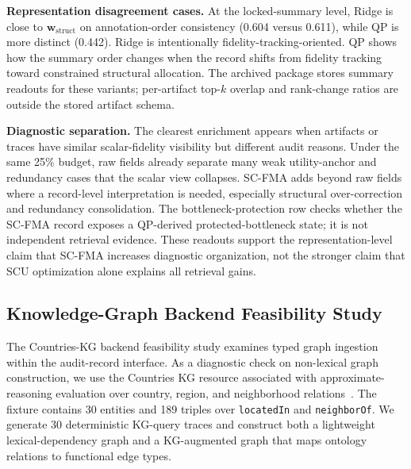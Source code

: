 \documentclass[a4paper,fleqn]{cas-sc}
\newcommand{\wstruct}{\ensuremath{\mathbf{w}_{\mathrm{struct}}}}
\begin{document}
\textbf{Representation disagreement cases.} At the locked-summary level, Ridge is close to \wstruct{} on annotation-order consistency (0.604 versus 0.611), while QP is more distinct (0.442). Ridge is intentionally fidelity-tracking-oriented. QP shows how the summary order changes when the record shifts from fidelity tracking toward constrained structural allocation. The archived package stores summary readouts for these variants; per-artifact top-$k$ overlap and rank-change ratios are outside the stored artifact schema.

\textbf{Diagnostic separation.} The clearest enrichment appears when artifacts or traces have similar scalar-fidelity visibility but different audit reasons. Under the same 25\% budget, raw fields already separate many weak utility-anchor and redundancy cases that the scalar view collapses. SC-FMA adds beyond raw fields where a record-level interpretation is needed, especially structural over-correction and redundancy consolidation. The bottleneck-protection row checks whether the SC-FMA record exposes a QP-derived protected-bottleneck state; it is not independent retrieval evidence. These readouts support the representation-level claim that SC-FMA increases diagnostic organization, not the stronger claim that SCU optimization alone explains all retrieval gains.

\subsection{Knowledge-Graph Backend Feasibility Study}
\label{sec:kg-pilot}

The Countries-KG backend feasibility study examines typed graph ingestion within the audit-record interface. As a diagnostic check on non-lexical graph construction, we use the Countries KG resource associated with approximate-reasoning evaluation over country, region, and neighborhood relations~\cite{bouchard2015approximate}. The fixture contains 30 entities and 189 triples over \texttt{locatedIn} and \texttt{neighborOf}. We generate 30 deterministic KG-query traces and construct both a lightweight lexical-dependency graph and a KG-augmented graph that maps ontology relations to functional edge types.
\end{document}
